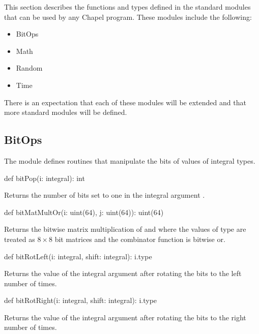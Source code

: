 \label{Standard_Modules}

This section describes the functions and types defined in the standard
modules that can be used by any Chapel program.  These modules include
the following:
\begin{itemize}
\item BitOps
\item Math
\item Random
\item Time
\end{itemize}
There is an expectation that each of these modules will be extended
and that more standard modules will be defined.

\subsection{BitOps}
\label{BitOps}

The module  defines routines that manipulate the bits of
values of integral types.

\vspace{1pc}

\begin{protohead}
def bitPop(i: integral): int
\end{protohead}
\begin{protobody}
Returns the number of bits set to one in the integral
argument .
\end{protobody}

\begin{protohead}
def bitMatMultOr(i: uint(64), j: uint(64)): uint(64)
\end{protohead}
\begin{protobody}
Returns the bitwise matrix multiplication of  and 
where the values of  type are treated as $8 \times 8$
bit matrices and the combinator function is bitwise or.
\end{protobody}

\begin{protohead}
def bitRotLeft(i: integral, shift: integral): i.type
\end{protohead}
\begin{protobody}
Returns the value of the integral argument  after rotating the
bits to the left  number of times.
\end{protobody}

\begin{protohead}
def bitRotRight(i: integral, shift: integral): i.type
\end{protohead}
\begin{protobody}
Returns the value of the integral argument  after rotating the
bits to the right  number of times.
\end{protobody}

